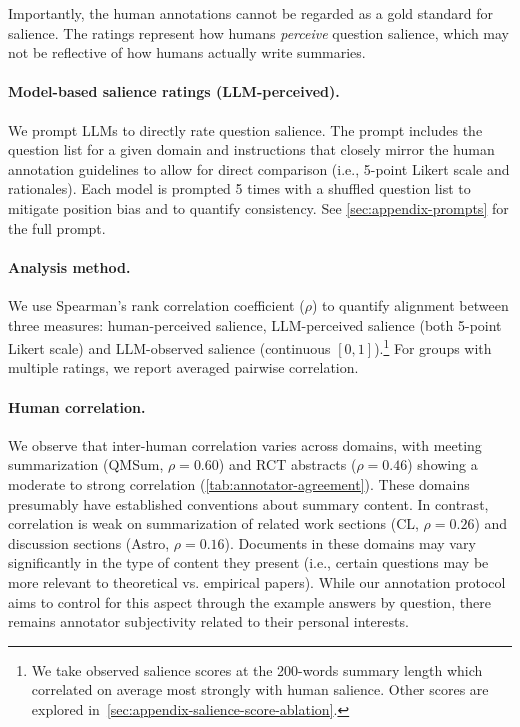 Importantly, the human annotations cannot be regarded as a gold standard for salience. The ratings represent how humans \emph{perceive} question salience, which may not be reflective of how humans actually write summaries.

\paragraph{Model-based salience ratings (LLM-perceived).}
We prompt LLMs to directly rate question salience.
The prompt includes the question list for a given domain and instructions that closely mirror the human annotation guidelines to allow for direct comparison (i.e., 5-point Likert scale and rationales).
Each model is prompted 5 times with a shuffled question list to mitigate position bias and to quantify consistency.
See \cref{sec:appendix-prompts} for the full prompt.

\paragraph{Analysis method.}
We use Spearman's rank correlation coefficient ($\rho$) to quantify alignment between three measures: human-perceived salience, LLM-perceived salience (both 5-point Likert scale) and LLM-observed salience (continuous $[0,1]$).\footnote{We take observed salience scores at the 200-words summary length which correlated on average most strongly with human salience. Other scores are explored in~\cref{sec:appendix-salience-score-ablation}.}
For groups with multiple ratings, we report averaged pairwise correlation.

\paragraph{Human correlation.}
We observe that inter-human correlation varies across domains, with meeting summarization (QMSum, $\rho = 0.60$) and RCT abstracts ($\rho = 0.46$) showing a moderate to strong correlation (\cref{tab:annotator-agreement}).
These domains presumably have established conventions about summary content.
In contrast, correlation is weak on summarization of related work sections (CL, $\rho = 0.26$) and discussion sections (Astro, $\rho = 0.16$).
Documents in these domains may vary significantly in the type of content they present (i.e., certain questions may be more relevant to theoretical vs. empirical papers).
While our annotation protocol aims to control for this aspect through the example answers by question, there remains annotator subjectivity related to their personal interests.

